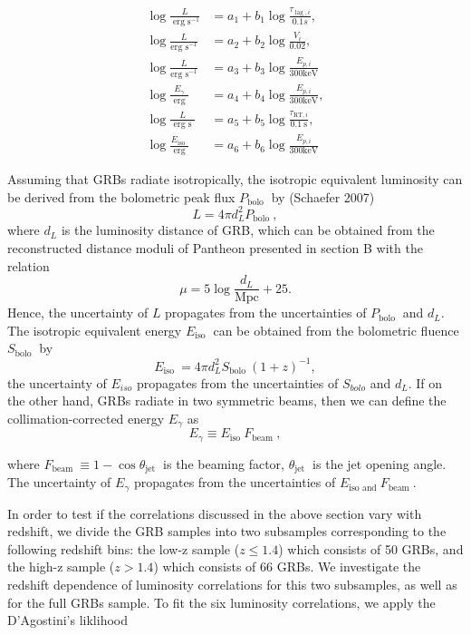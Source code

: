 \begin{align}
\log \frac{L}{\operatorname{erg} \mathrm{s}^{-1}} &= a_{1}+b_{1} \log \frac{\tau_{\operatorname{lag}, i}}{0.1 s}, \\
\log \frac{L}{\operatorname{erg~s}^{-1}} &= a_{2}+b_{2} \log \frac{V_{i}}{0.02}, \\
 \log \frac{L}{\operatorname{erg~s}^{-1}} &= a_{3}+b_{3} \log \frac{E_{p, i}}{300 \mathrm{keV}}\\
\log \frac{E_{\gamma}}{\text { erg }} &= a_{4}+b_{4} \log \frac{E_{p, i}}{300 \mathrm{keV}}, \\
\log \frac{L}{\text { erg s }} &= a_{5}+b_{5} \log \frac{\tau_{\mathrm{RT}, i}}{0.1 \mathrm{~s}}, \\
\log \frac{E_{\text {iso }}}{\text { erg }} &= a_{6}+b_{6} \log \frac{E_{p, i}}{300 \mathrm{keV}}
\end{align}

Assuming that GRBs radiate isotropically, the isotropic equivalent luminosity can be derived from the bolometric peak flux $P_{\text {bolo }}$ by (Schaefer 2007)
$$
L=4 \pi d_{L}^{2} P_{\text {bolo }},
$$
where $d_{L}$ is the luminosity distance of GRB, which can be obtained from the reconstructed distance moduli of Pantheon presented in section B with the relation
$$
\mu=5 \log \frac{d_{L}}{\mathrm{Mpc}}+25 .
$$
Hence, the uncertainty of $L$ propagates from the uncertainties of $P_{\text {bolo }}$ and $d_{L}$. The isotropic equivalent energy $E_{\text {iso }}$ can be obtained from the bolometric fluence $S_{\text {bolo }}$ by
$$
E_{\text {iso }}=4 \pi d_{L}^{2} S_{\text {bolo }}(1+z)^{-1},
$$
the uncertainty of $E_{iso}$ propagates from the uncertainties of $S_{bolo}$ and $d_L$. If on the other hand, GRBs radiate in two symmetric beams, then we can define the collimation-corrected energy $E_{\gamma}$ as
$$
E_{\gamma} \equiv E_{\text {iso }} F_{\text {beam }},
$$

where $F_{\text {beam }} \equiv 1-\cos \theta_{\text {jet }}$ is the beaming factor, $\theta_{\text {jet }}$ is the jet opening angle. The uncertainty of $E_{\gamma}$ propagates from the uncertainties of $E_{\text {iso and }} F_{\text {beam }}$.

In order to test if the correlations discussed in the above
section vary with redshift, we divide the GRB samples
into two subsamples corresponding to the following redshift
bins: the low-z sample ($z \leq 1.4$) which consists of 50 GRBs, and the high-z sample ($z > 1.4$) which consists of 66 GRBs. We investigate the redshift dependence of luminosity correlations for this two subsamples, as well as for the full GRBs sample. To fit the six luminosity correlations, we apply the D’Agostini’s liklihood\cite{d2005fits}


